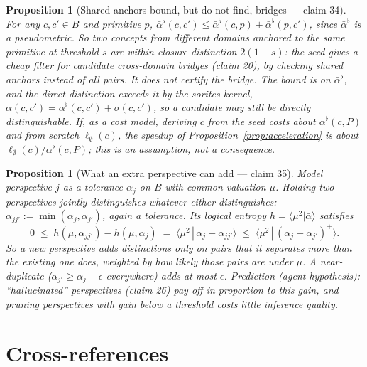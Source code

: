 \documentclass[11pt,a4paper]{article}
\newtheorem{proposition}[definition]{Proposition}
\begin{document}
\begin{proposition}[Shared anchors bound, but do not find, bridges --- claim 34]
\label{prop:v2-accel}
For any $c,c'\in B$ and primitive $p$,
$\bar\alpha^{\flat}(c,c')\le\bar\alpha^{\flat}(c,p)+\bar\alpha^{\flat}(p,c')$,
since $\bar\alpha^{\flat}$ is a pseudometric. So two concepts from different
domains anchored to the same primitive at threshold $s$ are within closure
distinction $2(1-s)$: the seed gives a cheap \emph{filter} for candidate
cross-domain bridges (claim 20), by checking shared anchors instead of all
pairs. It does not certify the bridge. The bound is on $\bar\alpha^{\flat}$,
and the direct distinction exceeds it by the sorites kernel,
$\bar\alpha(c,c')=\bar\alpha^{\flat}(c,c')+\sigma(c,c')$, so a candidate may still be
directly distinguishable. If, as a cost model, deriving $c$ from the seed
costs about $\bar\alpha^{\flat}(c,P)$ and from scratch $\ell_\emptyset(c)$,
the speedup of Proposition~\ref{prop:acceleration} is about
$\ell_\emptyset(c)/\bar\alpha^{\flat}(c,P)$; this is an assumption, not a
consequence.
\end{proposition}

\begin{proposition}[What an extra perspective can add --- claim 35]
\label{conj:v2-diverse}
Model perspective $j$ as a tolerance $\alpha_j$ on $B$ with common valuation
$\mu$. Holding two perspectives jointly distinguishes whatever either
distinguishes: $\alpha_{jj'}:=\min(\alpha_j,\alpha_{j'})$, again a tolerance.
Its logical entropy $h=\langle\mu^2|\bar\alpha\rangle$ satisfies
\[
  0\;\le\;h(\mu,\alpha_{jj'})-h(\mu,\alpha_j)
  \;=\;\langle\mu^2\,|\,\alpha_j-\alpha_{jj'}\rangle
  \;\le\;\langle\mu^2\,|\,(\alpha_j-\alpha_{j'})^+\rangle .
\]
So a new perspective adds distinctions only on pairs that it separates more
than the existing one does, weighted by how likely those pairs are under
$\mu$. A near-duplicate ($\alpha_{j'}\ge\alpha_j-\epsilon$ everywhere) adds at
most $\epsilon$. Prediction (agent hypothesis): ``hallucinated'' perspectives
(claim 26) pay off in proportion to this gain, and pruning perspectives with
gain below a threshold costs little inference quality.
\end{proposition}

\section{Cross-references}
\end{document}
